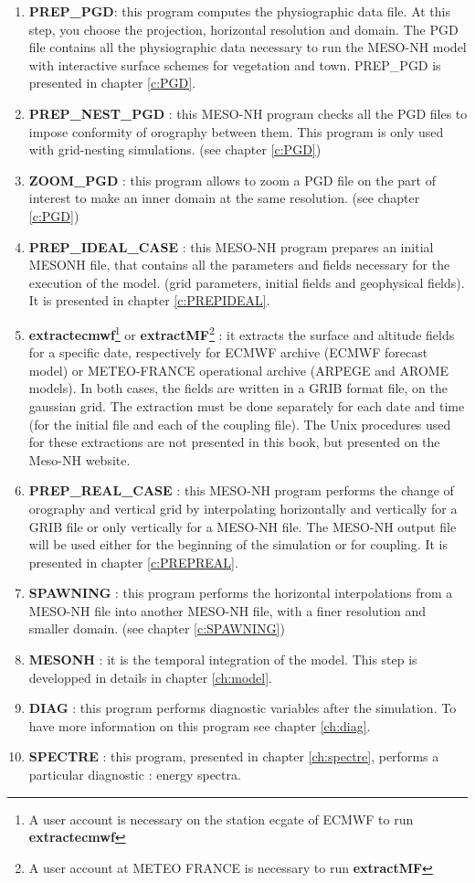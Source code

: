 \begin{enumerate}
\item
{\bf PREP\_PGD}: this program computes the physiographic data file.
 At this step, you choose the projection, horizontal resolution
and domain. The PGD file contains all the physiographic data
necessary to run the MESO-NH model with interactive surface schemes for
vegetation and town. PREP\_PGD is presented in chapter \ref{c:PGD}.
\item
{\bf PREP\_NEST\_PGD }: this MESO-NH program checks all the PGD files  to impose
conformity of orography between them. This program is only used with grid-nesting simulations. (see chapter \ref{c:PGD})
\item 
{\bf ZOOM\_PGD }: this program allows to zoom  a PGD file  on the part of interest to make an inner domain at the same resolution. (see chapter \ref{c:PGD})
\item 
{\bf PREP\_IDEAL\_CASE }: this MESO-NH program prepares an initial MESONH file, 
that contains all the parameters and fields necessary for the execution of the model.
 (grid parameters, initial fields and geophysical fields). It is presented in chapter \ref{c:PREPIDEAL}.
\item
{\bf extractecmwf}\footnote{A user account is necessary on the station ecgate of ECMWF to run
{\bf extractecmwf}} 
or {\bf extractMF}\footnote{A user account at METEO FRANCE is necessary to run
{\bf extractMF}} 
: it extracts the surface
and altitude fields for a specific date, respectively for ECMWF archive 
(ECMWF forecast model) or
METEO-FRANCE operational archive (ARPEGE and AROME models).
In both cases, the fields are written in a GRIB format file, on the gaussian
grid. The extraction must be done separately for each date and time (for
the initial file and each of the coupling file). The Unix procedures used for these extractions are not presented in this book, but presented on the Meso-NH website.
\item 
{\bf PREP\_REAL\_CASE }: this MESO-NH program performs the change of
orography and vertical grid by interpolating horizontally and vertically for a 
GRIB file or only vertically for a MESO-NH file. The MESO-NH output file  will
 be used either for the beginning of the simulation or for coupling. It is presented in chapter \ref{c:PREPREAL}.
\item
{\bf SPAWNING} : this program performs the horizontal interpolations from a
MESO-NH file into another MESO-NH file, with a finer resolution and smaller
domain. (see chapter \ref{c:SPAWNING})
\item
{\bf MESONH } : it is the temporal integration of the model. This step is developped in details in chapter \ref{ch:model}.
\item 
{\bf DIAG } : this program performs diagnostic variables after the simulation. To have more information on this program see chapter \ref{ch:diag}.
\item
{\bf SPECTRE }: this program, presented in chapter \ref{ch:spectre}, performs a particular diagnostic : energy spectra.
\end{enumerate} 

